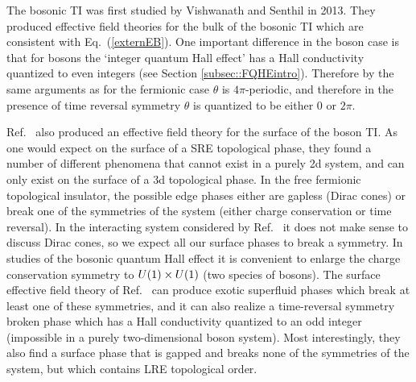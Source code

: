 The bosonic TI was first studied by Vishwanath and Senthil in 2013\cite{SenthilVishwanath}. They produced effective field theories for the bulk of the bosonic TI which are consistent with Eq.~(\ref{externEB}). One important difference in the boson case is that for bosons the `integer quantum Hall effect' has a Hall conductivity quantized to even integers (see Section \ref{subsec::FQHEintro}). Therefore by the same arguments as for the fermionic case $\theta$ is $4\pi$-periodic, and therefore in the presence of time reversal symmetry $\theta$ is quantized to be either $0$ or $2\pi$. 

Ref.~\cite{SenthilVishwanath} also produced an effective field theory for the surface of the boson TI. As one would expect on the surface of a SRE topological phase, they found a number of different phenomena that cannot exist in a purely 2d system, and can only exist on the surface of a 3d topological phase. 
In the free fermionic topological insulator, the possible edge phases either are gapless (Dirac cones) or break one of the symmetries of the system (either charge conservation or time reversal). In the interacting system considered by Ref.~\cite{SenthilVishwanath} it does not make sense to discuss Dirac cones, so we expect all our surface phases to break a symmetry. In studies of the bosonic quantum Hall effect it is convenient to enlarge the charge conservation symmetry to $U(1)\times U(1)$ (two species of bosons). The surface effective field theory of Ref.~\cite{SenthilVishwanath} can produce exotic superfluid phases which break at least one of these symmetries, and it can also realize a time-reversal symmetry broken phase which has a Hall conductivity quantized to an odd integer (impossible in a purely two-dimensional boson system). Most interestingly, they also find a surface phase that is gapped and breaks none of the symmetries of the system, but which contains LRE topological order.

